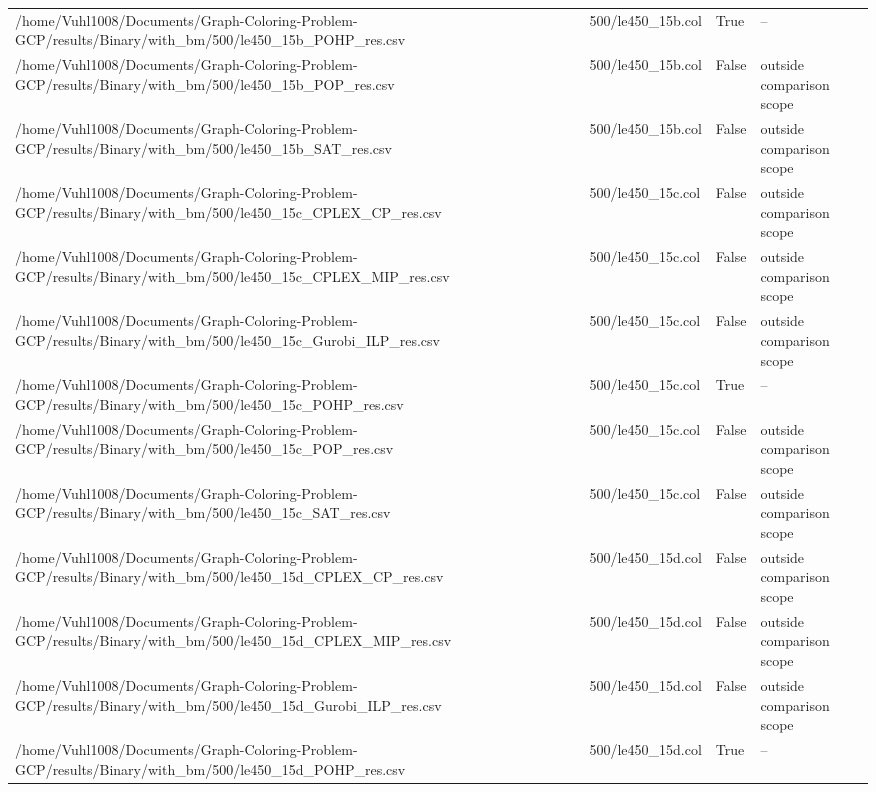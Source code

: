 \begin{table}[htbp]
\begin{tabular}{llll}
/home/Vuhl1008/Documents/Graph-Coloring-Problem-GCP/results/Binary/with\_bm/500/le450\_15b\_POHP\_res.csv & 500/le450\_15b.col & True & -- \\
/home/Vuhl1008/Documents/Graph-Coloring-Problem-GCP/results/Binary/with\_bm/500/le450\_15b\_POP\_res.csv & 500/le450\_15b.col & False & outside comparison scope \\
/home/Vuhl1008/Documents/Graph-Coloring-Problem-GCP/results/Binary/with\_bm/500/le450\_15b\_SAT\_res.csv & 500/le450\_15b.col & False & outside comparison scope \\
/home/Vuhl1008/Documents/Graph-Coloring-Problem-GCP/results/Binary/with\_bm/500/le450\_15c\_CPLEX\_CP\_res.csv & 500/le450\_15c.col & False & outside comparison scope \\
/home/Vuhl1008/Documents/Graph-Coloring-Problem-GCP/results/Binary/with\_bm/500/le450\_15c\_CPLEX\_MIP\_res.csv & 500/le450\_15c.col & False & outside comparison scope \\
/home/Vuhl1008/Documents/Graph-Coloring-Problem-GCP/results/Binary/with\_bm/500/le450\_15c\_Gurobi\_ILP\_res.csv & 500/le450\_15c.col & False & outside comparison scope \\
/home/Vuhl1008/Documents/Graph-Coloring-Problem-GCP/results/Binary/with\_bm/500/le450\_15c\_POHP\_res.csv & 500/le450\_15c.col & True & -- \\
/home/Vuhl1008/Documents/Graph-Coloring-Problem-GCP/results/Binary/with\_bm/500/le450\_15c\_POP\_res.csv & 500/le450\_15c.col & False & outside comparison scope \\
/home/Vuhl1008/Documents/Graph-Coloring-Problem-GCP/results/Binary/with\_bm/500/le450\_15c\_SAT\_res.csv & 500/le450\_15c.col & False & outside comparison scope \\
/home/Vuhl1008/Documents/Graph-Coloring-Problem-GCP/results/Binary/with\_bm/500/le450\_15d\_CPLEX\_CP\_res.csv & 500/le450\_15d.col & False & outside comparison scope \\
/home/Vuhl1008/Documents/Graph-Coloring-Problem-GCP/results/Binary/with\_bm/500/le450\_15d\_CPLEX\_MIP\_res.csv & 500/le450\_15d.col & False & outside comparison scope \\
/home/Vuhl1008/Documents/Graph-Coloring-Problem-GCP/results/Binary/with\_bm/500/le450\_15d\_Gurobi\_ILP\_res.csv & 500/le450\_15d.col & False & outside comparison scope \\
/home/Vuhl1008/Documents/Graph-Coloring-Problem-GCP/results/Binary/with\_bm/500/le450\_15d\_POHP\_res.csv & 500/le450\_15d.col & True & -- \\

\end{tabular}
\end{table}
